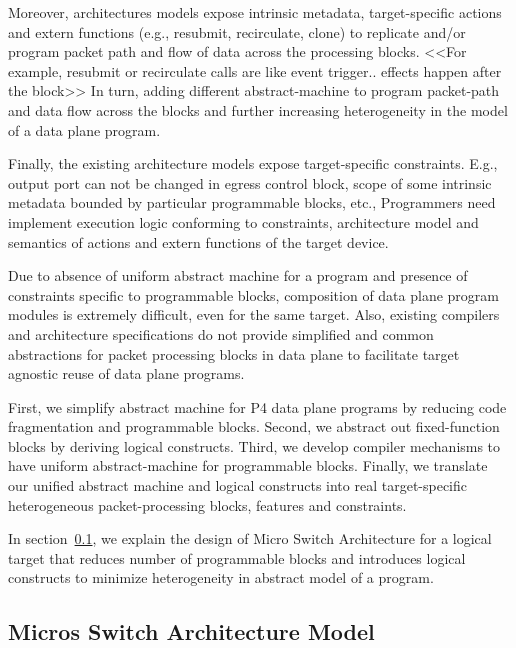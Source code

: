 \documentclass[10pt,sigconf,letterpaper,anonymous]{acmart}
\begin{document}
Moreover, architectures models expose intrinsic metadata, target-specific actions and extern functions (e.g., resubmit, recirculate, clone) to replicate and/or program packet path and flow of data across the processing blocks.
<<For example, resubmit or recirculate calls are like event trigger.. effects happen after the block>>
In turn, adding different abstract-machine to program packet-path and data flow across the blocks and further increasing heterogeneity in the model of a data plane program.

Finally, the existing architecture models expose target-specific constraints.
E.g., output port can not be changed in egress control block, scope of some intrinsic metadata bounded by particular programmable blocks, etc.,  
Programmers need implement execution logic conforming to constraints, architecture model and semantics of actions and extern functions of the target device.


Due to absence of uniform abstract machine for a program and presence of constraints specific to programmable blocks, composition of data plane program modules is extremely difficult, even for the same target. 
Also, existing compilers and architecture specifications do not provide simplified and common abstractions for packet processing blocks in data plane to facilitate target agnostic reuse of data plane programs.


First, we simplify abstract machine for P4 data plane programs by reducing code fragmentation and programmable blocks.
Second, we abstract out fixed-function blocks by deriving logical constructs.
Third, we develop compiler mechanisms to have uniform abstract-machine for programmable blocks.
Finally, we translate our unified abstract machine and logical constructs into real target-specific heterogeneous packet-processing blocks, features and constraints.

In section~\ref{lbl:micros-switch-architecture-model}, we explain the design of Micro Switch Architecture for a logical target that reduces number of programmable blocks and introduces logical constructs to minimize heterogeneity in abstract model of a program.

\subsection{Micros Switch Architecture Model}
\label{lbl:micros-switch-architecture-model}
\end{document}
